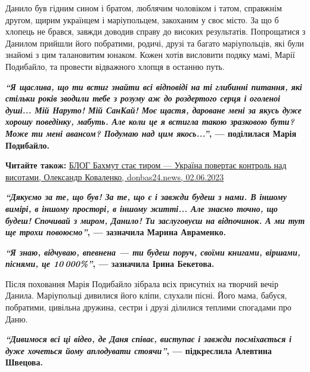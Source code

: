 Данило був гідним сином і братом, люблячим чоловіком і татом, справжнім другом,
щирим українцем і маріупольцем, закоханим у своє місто. За що б хлопець не
брався, завжди доводив справу до високих результатів. Попрощатися з Данилом
прийшли його побратими, родичі, друзі та багато маріупольців, які були знайомі
з цим талановитим юнаком. Кожен хотів висловити подяку мамі, Марії Подибайло,
та провести відважного хлопця в останню путь. 

\begin{leftbar}
	\begingroup
		\bfseries
{\color{blue}\em\enquote{Я щаслива, що ти встиг знайти всі відповіді на ті глибинні питання, які
стільки років зводили тебе з розуму аж до роздертого серця і оголеноі
душі... Мій Наруто! Мій СанКай! Моє щастя, дароване мені за якусь дуже
хорошу поведінку, мабуть. Але коли це я встигла такою зразковою бути?
Може ти мені авансом? Подумаю над цим якось...}}, — поділилася Марія
Подибайло.
	\endgroup
\end{leftbar}


\textbf{Читайте також:} \href{https://donbas24.news/news/baxmut-staje-tirom-ukrayina-povertaje-kontrol-nad-visotami}{%
БЛОГ Бахмут стає тиром — Україна повертає контроль над висотами, Олександр Коваленко, donbas24.news, 02.06.2023}

\begin{leftbar}
	\begingroup
		\bfseries
{\color{blue}\em\enquote{Дякуємо за те, що був! За те, що є і завжди будеш з нами. В іншому
вимірі, в іншому просторі, в іншому житті... Але знаємо точно, що будеш!
Спочивай з миром, Данило! Ти заслуговуєш на відпочинок. А ми тут ще
трохи повоюємо}}, — зазначила Марина Авраменко.
	\endgroup
\end{leftbar}

\begin{leftbar}
	\begingroup
		\bfseries
{\color{blue}\em\enquote{Я знаю, відчуваю, впевнена — ти будеш поруч, своїми
книгами, віршами, піснями, це 10 000\%}}, — зазначила Ірина Бекетова.
	\endgroup
\end{leftbar}

Після поховання Марія Подибайло зібрала всіх присутніх на творчий вечір Данила.
Маріупольці дивилися його кліпи, слухали пісні. Його мама, бабуся, побратими,
цивільна дружина, сестри і друзі ділилися теплими спогадами про Даню. 

\begin{leftbar}
	\begingroup
		\bfseries
{\color{blue}\em\enquote{Дивимося всі ці відео, де Даня співає, виступає і завжди посміхається і
дуже хочеться йому аплодувати стоячи}}, — підкреслила Алевтина Швецова. 
	\endgroup
\end{leftbar}

